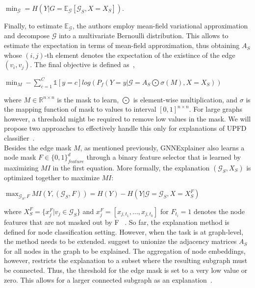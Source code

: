 \begin{center}
    $\min_{\mathcal{G}} = H(Y | G = \mathbb{E}_{\mathcal{G}} [\mathcal{G}_S, X = X_S])$.
\end{center}
Finally, to estimate $\mathbb{E}_{\mathcal{G}}$, the authors employ mean-field variational approximation and decompose $\mathcal{G}$ into a multivariate Bernoulli distribution. This allows to estimate the expectation in terms of mean-field approximation, thus obtaining $A_S$ whose $(i, j)$-th element denotes the expectation of the existince of the edge $(v_i, v_j)$. The final objective is defined as~\parencite{GNNExplainer_Ying},
\begin{center}
    $\min_M - \sum_{c=1}^C \mathbb{1}[y = c] log (P_f (Y=y | \mathcal{G} = A_S \bigodot \sigma(M), X = X_S))$
\end{center}
where $M \in \mathbb{R}^{n \times n}$ is the mask to learn, $\bigodot$ is element-wise multiplication, and $\sigma$ is
the mapping function of mask to values to interval $[0, 1]^{n \times n}$. For large graphs however, a threshold might be required to remove low values in the mask. We will propose two approaches to effectively
handle this only for explanations of UPFD classifier~\parencite{GNNExplainer_Ying}.\\
Besides the edge mask $M$, as mentioned previously, GNNExplainer also learns a node mask $F \in \{0, 1\}^d_{feature}$ through a binary feature selector that is learned by maximizing $MI$ in the first equation. More formally, the explanation $(\mathcal{G}_S, X_S)$ is optimized together to maximize $MI$:
\begin{center}
    $\max_{\mathcal{G}_S, F} MI (Y, (\mathcal{G}_S, F)) = H(Y) - H(Y | \mathcal{G} = \mathcal{G}_S, X = X_S^F)$
\end{center}
where $X_S^F = \{x_j^F|v_j \in \mathcal{G}_S\}$ and $x_j^F = [x_{j, t_1}, \dots, x_{j, t_k}]$ for
$F_{t_i} = 1$ denotes the node features that are not masked out by F~\parencite{GNNExplainer_Ying} . So far, the
explanation method is defined for node classification setting. However, when the task is at graph-level, the method needs
to be extended. \cite{GNNExplainer_Ying} suggest to unionize  the adjacency matrices $A_S$ for all nodes in the graph to
be explained. The aggregation of node embeddings, however, restricts the explanation to a subset where the resulting
subgraph must be connected. Thus, the threshold for the edge mask is set to a very low value or zero. This allows for a larger connected subgraph as an explanation~\parencite{GNNExplainer_Ying}.\\


